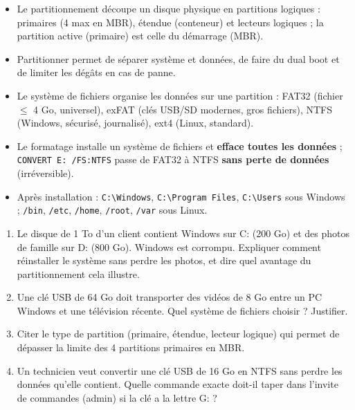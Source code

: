 \documentclass[11pt]{article}
\newcommand{\cle}[1]{{\popxbold\color{popdark}#1}}
\begin{document}
\begin{aretenir}
\begin{itemize}
\item Le \cle{partitionnement} découpe un disque physique en partitions logiques : primaires (4 max en MBR), étendue (conteneur) et lecteurs logiques ; la partition \cle{active} (primaire) est celle du démarrage (MBR).
\item Partitionner permet de séparer système et données, de faire du dual boot et de limiter les dégâts en cas de panne.
\item Le \cle{système de fichiers} organise les données sur une partition : FAT32 (fichier $\leq$ 4 Go, universel), exFAT (clés USB/SD modernes, gros fichiers), NTFS (Windows, sécurisé, journalisé), ext4 (Linux, standard).
\item Le \cle{formatage} installe un système de fichiers et \textbf{efface toutes les données} ; \texttt{CONVERT E: /FS:NTFS} passe de FAT32 à NTFS \textbf{sans perte de données} (irréversible).
\item Après installation : \texttt{C:\textbackslash Windows}, \texttt{C:\textbackslash Program Files}, \texttt{C:\textbackslash Users} sous Windows ; \texttt{/bin}, \texttt{/etc}, \texttt{/home}, \texttt{/root}, \texttt{/var} sous Linux.
\end{itemize}
\end{aretenir}

\begin{exercice}
\begin{enumerate}
\item Le disque de 1 To d'un client contient Windows sur C: (200 Go) et des photos de famille sur D: (800 Go). Windows est corrompu. Expliquer comment réinstaller le système sans perdre les photos, et dire quel avantage du partitionnement cela illustre.
\item Une clé USB de 64 Go doit transporter des vidéos de 8 Go entre un PC Windows et une télévision récente. Quel système de fichiers choisir ? Justifier.
\item Citer le type de partition (primaire, étendue, lecteur logique) qui permet de dépasser la limite des 4 partitions primaires en MBR.
\item Un technicien veut convertir une clé USB de 16 Go en NTFS sans perdre les données qu'elle contient. Quelle commande exacte doit-il taper dans l'invite de commandes (admin) si la clé a la lettre G: ?
\end{enumerate}
\end{exercice}
\end{document}
